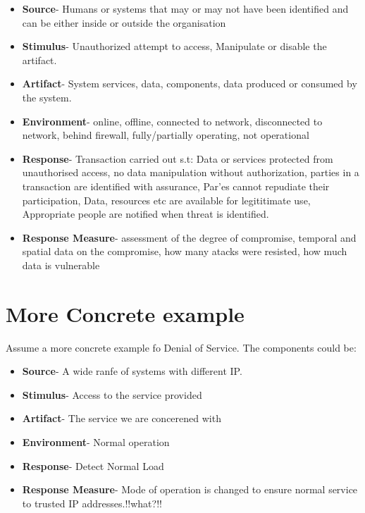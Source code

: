 \documentclass[a4paper]{report}
\begin{document}
\begin{itemize}
\item \textbf{Source}- Humans or systems that may or may not have been identified and can be either inside or outside the organisation
\item \textbf{Stimulus}- Unauthorized attempt to access, Manipulate or disable the artifact.
\item \textbf{Artifact}- System services, data, components, data produced or consumed by the system.
\item \textbf{Environment}- online, offline, connected to network, disconnected to network, behind firewall, fully/partially operating, not operational
\item \textbf{Response}- Transaction carried out s.t: Data or services protected from unauthorised access, no data manipulation without authorization, parties in a transaction are identified with assurance, Par'es cannot repudiate their participation, Data, resources etc are available for legititimate use, Appropriate people are notified when threat is identified.
\item \textbf{Response Measure}- assessment of the degree of compromise, temporal and spatial data on the compromise, how many atacks were resisted, how much data is vulnerable
\end{itemize}

\section{More Concrete example}
Assume a more concrete example fo Denial of Service. The components could be:
\begin{itemize}
\item \textbf{Source}- A wide ranfe of systems with different IP.
\item \textbf{Stimulus}- Access to the service provided
\item \textbf{Artifact}- The service we are concerened with
\item \textbf{Environment}- Normal operation
\item \textbf{Response}- Detect Normal Load
\item \textbf{Response Measure}- Mode of operation is changed to ensure normal service to trusted IP addresses.!!what?!!
\end{itemize}
\end{document}
